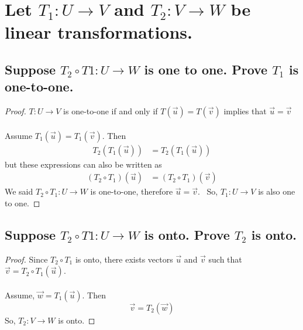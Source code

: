\documentclass[../main.tex]{subfiles}
\begin{document}
\section[Problem 3]{Let $T_{1}:U\rightarrow V$ and $T_{2}:V\rightarrow W$ be linear transformations.}
\subsection{Suppose $T_{2}\circ T{1}:U\rightarrow W$ is one to one. Prove $T_{1}$ is one-to-one.}
\begin{proof}
        $\displaystyle T:U\rightarrow V$ is one-to-one if and only if $\displaystyle T(\vec{u}) =T(\vec{v})$ implies that $\displaystyle \vec{u} =\vec{v}$\\\\
        Assume $\displaystyle T_{1}(\vec{u}) =T_{1}(\vec{v})$. Then
        \begin{align*}
                T_{2}( T_{1}(\vec{u})) & =T_{2}( T_{1}(\vec{u}))
        \end{align*}
        but these expressions can also be written as
        \begin{align*}
                ( T_{2} \circ T_{1})(\vec{u}) & =( T_{2} \circ T_{1})(\vec{v})
        \end{align*}
        We said $\displaystyle T_{2} \circ T_{1} :U\rightarrow W$ is one-to-one, therefore $\displaystyle \vec{u} =\vec{v}$. \ So, $\displaystyle T_{1} :U\rightarrow V$ is also one to one.
\end{proof}
\subsection{Suppose $T_{2}\circ T{1}:U\rightarrow W$ is onto. Prove $T_{2}$ is onto.}
\begin{proof}
        Since $\displaystyle T_{2} \circ T_{1}$ is onto, there exists vectors $\displaystyle \vec{u}$ and $\displaystyle \vec{v}$ such that $\displaystyle \vec{v} =T_{2} \circ T_{1}(\vec{u})$.\\\\
        Assume, $\displaystyle \vec{w} =T_{1}(\vec{u})$. Then
        \begin{equation*}
                \vec{v} =T_{2}(\vec{w})
        \end{equation*}So, $\displaystyle T_{2} :V\rightarrow W$ is onto.
\end{proof}
\end{document}
